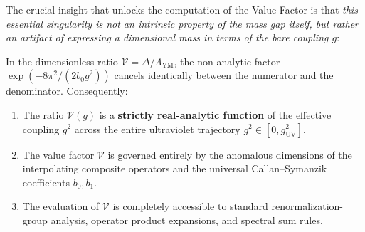 The crucial insight that unlocks the computation of the Value Factor is that \emph{this essential singularity is not an intrinsic property of the mass gap itself, but rather an artifact of expressing a dimensional mass in terms of the bare coupling $g$}:

\begin{theorem}
\label{thm:singularity_cancellation}
In the dimensionless ratio $\mathcal{V} = \Delta / \Lambda_{\mathrm{YM}}$, the non-analytic factor $\exp(-8\pi^2/(2b_0 g^2))$ cancels identically between the numerator and the denominator. Consequently:
\begin{enumerate}
    \item The ratio $\mathcal{V}(g)$ is a \textbf{strictly real-analytic function} of the effective coupling $g^2$ across the entire ultraviolet trajectory $g^2 \in [0, g_{\mathrm{UV}}^2]$.
    \item The value factor $\mathcal{V}$ is governed entirely by the anomalous dimensions of the interpolating composite operators and the universal Callan--Symanzik coefficients $b_0, b_1$.
    \item The evaluation of $\mathcal{V}$ is completely accessible to standard renormalization-group analysis, operator product expansions, and spectral sum rules.
\end{enumerate}
\end{theorem}

